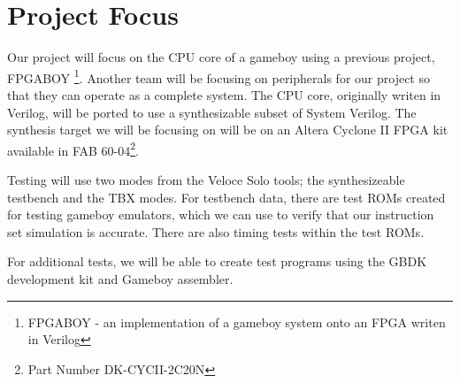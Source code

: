 \section{Project Focus}
Our project will focus on the CPU core of a gameboy using a previous project,
FPGABOY \footnote{FPGABOY - an implementation of a gameboy system onto an FPGA 
writen in Verilog}. Another team will be focusing on peripherals for our project 
so that they can operate as a complete system. The CPU core, originally writen 
in Verilog, will be ported to use a synthesizable subset of System Verilog.
The synthesis target we will be focusing on will be on an Altera Cyclone II 
FPGA kit available in FAB 60-04\footnote{Part Number DK-CYCII-2C20N}.

Testing will use two modes from the Veloce Solo tools; the synthesizeable 
testbench and the TBX modes. For testbench data, there are test ROMs created 
for testing gameboy emulators, which we can use to verify that our instruction 
set simulation is accurate. There are also timing tests within the test ROMs. 

For additional tests, we will be able to create test programs using the GBDK development kit and Gameboy assembler.


